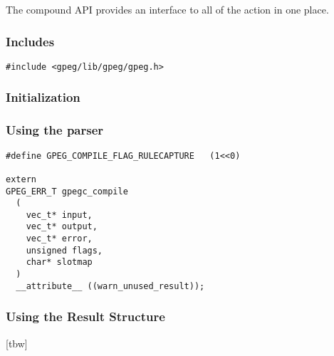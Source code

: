 The compound API provides an interface to all of the action in one place.

\subsubsection{Includes}

\begin{myquote}
\begin{verbatim}
#include <gpeg/lib/gpeg/gpeg.h>
\end{verbatim}
\end{myquote}

\subsubsection{Initialization}

\subsubsection{Using the parser}

\begin{myquote}
\begin{verbatim}
#define GPEG_COMPILE_FLAG_RULECAPTURE   (1<<0)

extern
GPEG_ERR_T gpegc_compile
  (
    vec_t* input,
    vec_t* output,
    vec_t* error,
    unsigned flags,
    char* slotmap
  )
  __attribute__ ((warn_unused_result));
\end{verbatim}
\end{myquote}

\subsubsection{Using the Result Structure}

[tbw]
